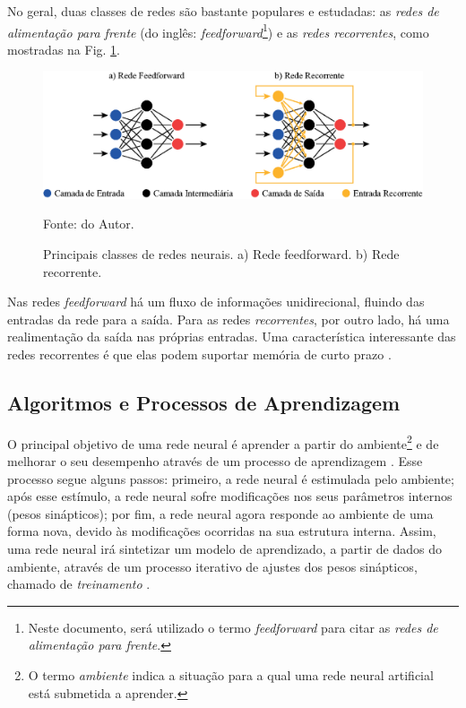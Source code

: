 No geral, duas classes de redes são bastante populares e estudadas: as \textit{redes de alimentação para frente} (do inglês: \textit{feedforward}\footnote{Neste documento, será utilizado o termo \textit{feedforward} para citar as \textit{redes de alimentação para frente}.}) e as \textit{redes recorrentes}, como mostradas na Fig. \ref{fig: NeuralNetworkFeedforwardAndRecurrent}.

\begin{figure}[H]
    \centering
    \includegraphics{04-Figuras/NeuralNetworkFeedforwardAndRecurrent.eps}
    \caption{Principais classes de redes neurais. a) Rede feedforward. b) Rede recorrente.} \par
    Fonte: do Autor.
    \label{fig: NeuralNetworkFeedforwardAndRecurrent}
\end{figure}

Nas redes \textit{feedforward} há um fluxo de informações unidirecional, fluindo das entradas da rede para a saída. Para as redes \textit{recorrentes}, por outro lado, há uma realimentação da saída nas próprias entradas. Uma característica interessante das redes recorrentes é que elas podem suportar memória de curto prazo \cite{russell2020artificial}.


\subsection{Algoritmos e Processos de Aprendizagem}

O principal objetivo de uma rede neural é aprender a partir do ambiente\footnote{O termo \textit{ambiente} indica a situação para a qual uma rede neural artificial está submetida a aprender.} e de melhorar o seu desempenho através de um processo de aprendizagem \cite{haykin2007redes}. Esse processo segue alguns passos: primeiro, a rede neural é estimulada pelo ambiente; após esse estímulo, a rede neural sofre modificações nos seus parâmetros internos (pesos sinápticos); por fim, a rede neural agora responde ao ambiente de uma forma nova, devido às modificações ocorridas na sua estrutura interna. Assim, uma rede neural irá sintetizar um modelo de aprendizado, a partir de dados do ambiente, através de um processo iterativo de ajustes dos pesos sinápticos, chamado de \textit{treinamento} \cite{haykin2007redes,russell2020artificial}.

